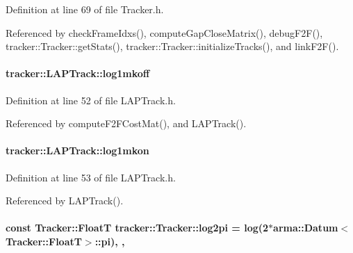 Definition at line 69 of file Tracker.\+h.



Referenced by check\+Frame\+Idxs(), compute\+Gap\+Close\+Matrix(), debug\+F2\+F(), tracker\+::\+Tracker\+::get\+Stats(), tracker\+::\+Tracker\+::initialize\+Tracks(), and link\+F2\+F().

\paragraph[{\texorpdfstring{log1mkoff}{log1mkoff}}]{ tracker\+::\+L\+A\+P\+Track\+::log1mkoff\hspace{0.3cm}{\ttfamily [protected]}}\hypertarget{classtracker_1_1LAPTrack_a0d698061ef3117aed73b71975b217ef1}{}\label{classtracker_1_1LAPTrack_a0d698061ef3117aed73b71975b217ef1}


Definition at line 52 of file L\+A\+P\+Track.\+h.



Referenced by compute\+F2\+F\+Cost\+Mat(), and L\+A\+P\+Track().

\paragraph[{\texorpdfstring{log1mkon}{log1mkon}}]{ tracker\+::\+L\+A\+P\+Track\+::log1mkon\hspace{0.3cm}{\ttfamily [protected]}}\hypertarget{classtracker_1_1LAPTrack_ac0e506d8b8b4e29689cbf2a112f86df4}{}\label{classtracker_1_1LAPTrack_ac0e506d8b8b4e29689cbf2a112f86df4}


Definition at line 53 of file L\+A\+P\+Track.\+h.



Referenced by L\+A\+P\+Track().

\paragraph[{\texorpdfstring{log2pi}{log2pi}}]{\setlength{\rightskip}{0pt plus 5cm}const {\bf Tracker\+::\+FloatT} tracker\+::\+Tracker\+::log2pi = log(2$\ast$arma\+::\+Datum$<${\bf Tracker\+::\+FloatT}$>$\+::pi)\hspace{0.3cm}{\ttfamily [static]}, {\ttfamily [protected]}, {\ttfamily [inherited]}}\hypertarget{classtracker_1_1Tracker_adf40b4f798f070419f5eb697b36b65ac}{}\label{classtracker_1_1Tracker_adf40b4f798f070419f5eb697b36b65ac}


